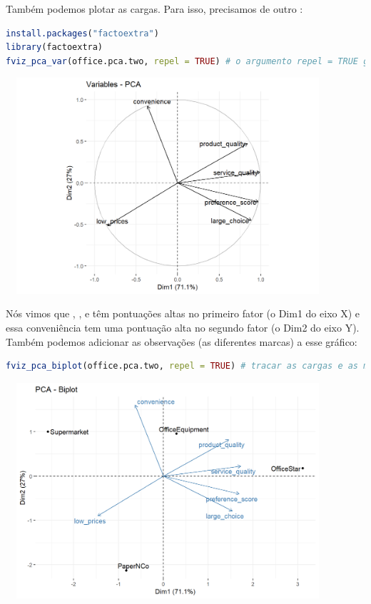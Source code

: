 \documentclass{article}
\begin{document}
Também podemos plotar as cargas. Para isso, precisamos de outro :

\begin{lstlisting}[language=R]
install.packages("factoextra")
library(factoextra)
fviz_pca_var(office.pca.two, repel = TRUE) # o argumento repel = TRUE garante que o texto seja exibido corretamente no grafico
\end{lstlisting}


\begin{center}
\includegraphics[width=12cm,height=8cm]{perceptual_loading_plot-1.png}
\end{center}

Nós vimos que , ,  e  têm pontuações altas no primeiro fator (o Dim1 do eixo X) e essa conveniência tem uma pontuação alta no segundo fator (o Dim2 do eixo Y). Também podemos adicionar as observações (as diferentes marcas) a esse gráfico:

\newpage

\begin{lstlisting}[language=R]
fviz_pca_biplot(office.pca.two, repel = TRUE) # tracar as cargas e as marcas juntas em uma trama
\end{lstlisting}



\begin{center}
\includegraphics[width=12cm,height=8cm]{perceptual_biplot-1.png}
\end{center}
\end{document}
